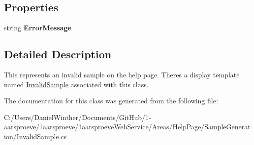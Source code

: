 \subsection*{Properties}
\begin{DoxyCompactItemize}
\item 
\hypertarget{class__1aarsproeve_web_service_1_1_areas_1_1_help_page_1_1_invalid_sample_aa93907902bb52616392de80e5d603f0b}{}string {\bfseries Error\+Message}\label{class__1aarsproeve_web_service_1_1_areas_1_1_help_page_1_1_invalid_sample_aa93907902bb52616392de80e5d603f0b}

\end{DoxyCompactItemize}


\subsection{Detailed Description}
This represents an invalid sample on the help page. There\textquotesingle{}s a display template named \hyperlink{class__1aarsproeve_web_service_1_1_areas_1_1_help_page_1_1_invalid_sample}{Invalid\+Sample} associated with this class. 



The documentation for this class was generated from the following file\+:\begin{DoxyCompactItemize}
\item 
C\+:/\+Users/\+Daniel\+Winther/\+Documents/\+Git\+Hub/1-\/aarsproeve/1aarsproeve/1aarsproeve\+Web\+Service/\+Areas/\+Help\+Page/\+Sample\+Generation/Invalid\+Sample.\+cs\end{DoxyCompactItemize}

